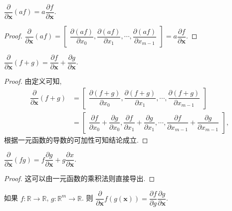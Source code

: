 \documentclass[10pt,UTF8]{book} %
\begin{document}
\setcounter{property}{0}
\begin{property}[齐次性]
    $\dfrac{\partial }{\partial \boldsymbol{x}}(af)
    =a \dfrac{\partial f}{\partial \boldsymbol{x}}$.
    \begin{proof}
        $\dfrac{\partial }{\partial \boldsymbol{x}}(af)
        = \begin{bmatrix}
            \dfrac{\partial (af)}{\partial x_0},
            \dfrac{\partial (af)}{\partial x_1},
            \cdots,
            \dfrac{\partial (af)}{\partial x_{m-1}}
        \end{bmatrix}
        =a \dfrac{\partial f}{\partial \boldsymbol{x}}$.
    \end{proof}
\end{property}
\begin{property}[叠加性]
    $\dfrac{\partial}{\partial \boldsymbol{x}}(f+g)
    = \dfrac{\partial f}{\partial \boldsymbol{x}}
    + \dfrac{\partial g}{\partial \boldsymbol{x}}$.
    \begin{proof}
        由定义可知, 
        \[ 
        \begin{aligned}
            \dfrac{\partial}{\partial \boldsymbol{x}}(f+g)
            & = \begin{bmatrix}
                \dfrac{\partial (f+g)}{\partial x_0},
                \dfrac{\partial (f+g)}{\partial x_1},
                \cdots,
                \dfrac{\partial (f+g)}{\partial x_{m-1}}
            \end{bmatrix} \\
            & = \begin{bmatrix}
                \dfrac{\partial f}{\partial x_0}+ \dfrac{\partial g}{\partial x_0},
                \dfrac{\partial f}{\partial x_1}+\dfrac{\partial g}{\partial x_1},
                \cdots,
                \dfrac{\partial f}{\partial x_{m-1}}+\dfrac{\partial g}{\partial x_{m-1}}
            \end{bmatrix},
        \end{aligned} \]
        根据一元函数的导数的可加性可知结论成立.
    \end{proof}
\end{property}
\begin{property}[乘积法则]
    $\dfrac{\partial}{\partial \boldsymbol{x}}(fg)
    = f\dfrac{\partial g}{\partial \boldsymbol{x}} 
    + g\dfrac{\partial x}{\partial \boldsymbol{x}}$.
    \begin{proof}
        这可以由一元函数的乘积法则直接导出.
    \end{proof}
\end{property}
\begin{property}[链式法则]
    如果 $f: \mathbb{R} \to \mathbb{R}$, $g: \mathbb{R}^m \to \mathbb{R}$.
    则 $\dfrac{\partial}{\partial \boldsymbol{x}}f(g(\boldsymbol{x}))
    = \dfrac{\partial f}{\partial g}
    \dfrac{\partial g}{\partial \boldsymbol{x}}$.
\end{property}
\end{document}
